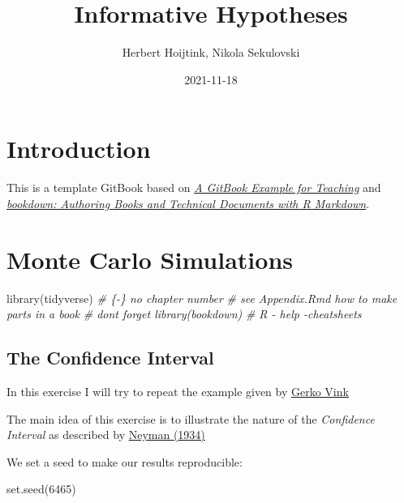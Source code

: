 \documentclass[
]{book}
\title{Informative Hypotheses}
\author{Herbert Hoijtink, Nikola Sekulovski}
\date{2021-11-18}
\newenvironment{Shaded}{\begin{snugshade}}{\end{snugshade}}
\newcommand{\CommentTok}[1]{\textcolor[rgb]{0.56,0.35,0.01}{\textit{#1}}}
\newcommand{\DecValTok}[1]{\textcolor[rgb]{0.00,0.00,0.81}{#1}}
\newcommand{\FunctionTok}[1]{\textcolor[rgb]{0.00,0.00,0.00}{#1}}
\newcommand{\NormalTok}[1]{#1}
\begin{document}
\maketitle

{
\setcounter{tocdepth}{1}
\tableofcontents
}
\hypertarget{introduction}{%
\chapter{Introduction}\label{introduction}}

This is a template GitBook based on \href{https://cjvanlissa.github.io/gitbook-demo/}{\emph{A GitBook Example for Teaching}} and \href{https://bookdown.org/yihui/bookdown/}{\emph{bookdown: Authoring Books and Technical Documents with R Markdown}}.

\hypertarget{monte-carlo-simulations}{%
\chapter{Monte Carlo Simulations}\label{monte-carlo-simulations}}

\begin{Shaded}
\begin{Highlighting}[]
\FunctionTok{library}\NormalTok{(tidyverse)}
\CommentTok{\# \{{-}\} no chapter number}
\CommentTok{\# see Appendix.Rmd how to make parts in a book}
\CommentTok{\# don\textquotesingle{}t forget library(bookdown)}
\CommentTok{\# R {-} help {-}cheatsheets}
\end{Highlighting}
\end{Shaded}

\hypertarget{the-confidence-interval}{%
\section{The Confidence Interval}\label{the-confidence-interval}}

In this exercise I will try to repeat the example given by \href{https://www.gerkovink.com/markup/Wk1/Solution_to_Ex1.html}{Gerko Vink}

The main idea of this exercise is to illustrate the nature of the \emph{Confidence Interval} as described by \href{http://www.stat.cmu.edu/~brian/905-2008/papers/neyman-1934-jrss.pdf}{Neyman (1934)}

We set a seed to make our results reproducible:

\begin{Shaded}
\begin{Highlighting}[]
\FunctionTok{set.seed}\NormalTok{(}\DecValTok{6465}\NormalTok{)}
\end{Highlighting}
\end{Shaded}
\end{document}
